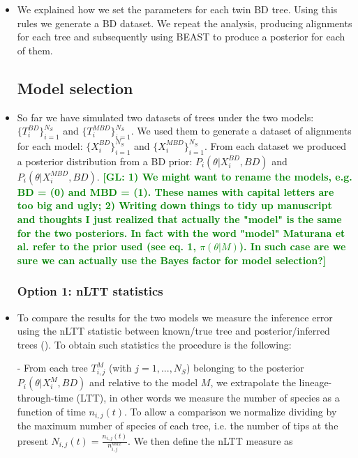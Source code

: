 \documentclass{article}
\newcommand*\gio[1]{\textcolor{green}{\textbf{[GL: #1]}}}
\begin{document}
\begin{itemize}
\item We explained how we set the parameters for each twin BD tree. Using this rules we generate a BD dataset. We repeat the analysis, producing alignments for each tree and subsequently using BEAST to produce a posterior for each of them.

\subsection{Model selection}

\item So far we have simulated two datasets of trees under the two models: $\{T_{i}^{BD}\}_{i=1}^{N_{S}}$ and $\{T_{i}^{MBD}\}_{i=1}^{N_{S}}$.
We used them to generate a dataset of alignments for each model: $\{X^{BD}_{i}\}_{i=1}^{N_{S}}$ and $\{X^{MBD}_{i}\}_{i=1}^{N_{S}}$. From each dataset we produced a posterior distribution from a BD prior: 
$P_{i}(\theta | X^{BD}_{i}, BD)$ and $P_{i}(\theta | X^{MBD}_{i}, BD)$.
\gio{1) We might want to rename the models, e.g. BD = (0) and MBD = (1). These names with capital letters are too big and ugly;
2) Writing down things to tidy up manuscript and thoughts I just realized that actually the "model" is the same for the two posteriors. In fact with the word "model" Maturana et al. refer to the prior used (see eq. 1, $\pi(\theta | M)$). In such case are we sure we can actually use the Bayes factor for model selection?}

\subsubsection{Option 1: nLTT statistics}
\item To compare the results for the two models we measure the inference error using the nLTT statistic between known/true tree and posterior/inferred trees (\cite{nltt}). To obtain such statistics the procedure is the following:

- From each tree $T_{i,j}^{M}$ (with $j=1,...,N_{S}$) belonging to the posterior $P_{i}(\theta | X^{M}_{i}, BD)$ and relative to the model $M$, we extrapolate the lineage-through-time (LTT), in other words we measure the number of species as a function of time $n_{i,j}(t)$. To allow a comparison we normalize dividing by the maximum number of species of each tree, i.e. the number of tips at the present $N_{i,j}(t)=\frac{n_{i,j}(t)}{n^{max}_{i,j}}$. We then define the nLTT measure as


\end{itemize}
\end{document}
